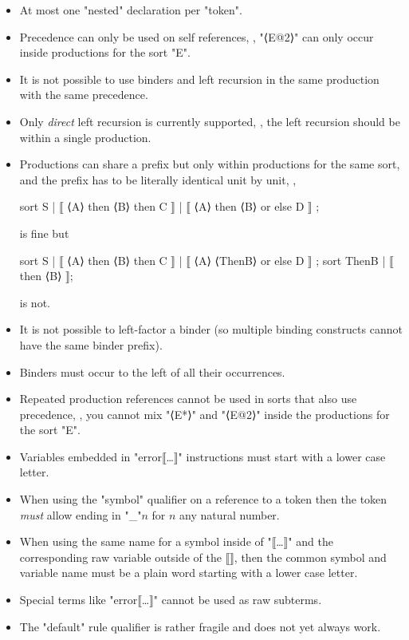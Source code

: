 \documentclass[11pt]{article} %
\begin{document}
\begin{manual}[limitations]\label{lim:list}\leavevmode
  \begin{itemize}

  \item At most one "nested" declaration per "token".

  \item Precedence can only be used on self references, \ie, "⟨E@2⟩" can only occur inside
    productions for the sort "E".

  \item It is not possible to use binders and left recursion in the same production with the same
    precedence.

  \item Only \emph{direct} left recursion is currently supported, \ie, the left recursion should be
    within a single production.

  \item Productions can share a prefix but only within productions for the same sort, and the prefix
    has to be literally identical unit by unit, \ie,
\begin{code}
sort S | ⟦ ⟨A⟩ then ⟨B⟩ then C ⟧
       | ⟦ ⟨A⟩ then ⟨B⟩ or else D ⟧ ;
\end{code}
    is fine but
\begin{code}
sort S | ⟦ ⟨A⟩ then ⟨B⟩ then C ⟧
       | ⟦ ⟨A⟩ ⟨ThenB⟩ or else D ⟧ ;
sort ThenB | ⟦ then ⟨B⟩ ⟧;
\end{code}
    is not.

  \item It is not possible to left-factor a binder (so multiple binding constructs cannot have the
    same binder prefix).

  \item Binders must occur to the left of all their occurrences.

  \item Repeated production references cannot be used in sorts that also use precedence, \ie, you
    cannot mix "⟨E*⟩" and "⟨E@2⟩" inside the productions for the sort "E".

  \item Variables embedded in "error⟦…⟧" instructions must start with a lower case letter.

  \item When using the "symbol" qualifier on a reference to a token then the token \emph{must} allow
    ending in "_"$n$ for $n$ any natural number.

  \item When using the same name for a symbol inside of "⟦…⟧" and the corresponding raw variable
    outside of the ⟦⟧, then the common symbol and variable name must be a plain word starting with a
    lower case letter.

  \item Special terms like "error⟦…⟧" cannot be used as raw subterms.

  \item The "default" rule qualifier is rather fragile and does not yet always work.

  \end{itemize}
\end{manual}
\end{document}
